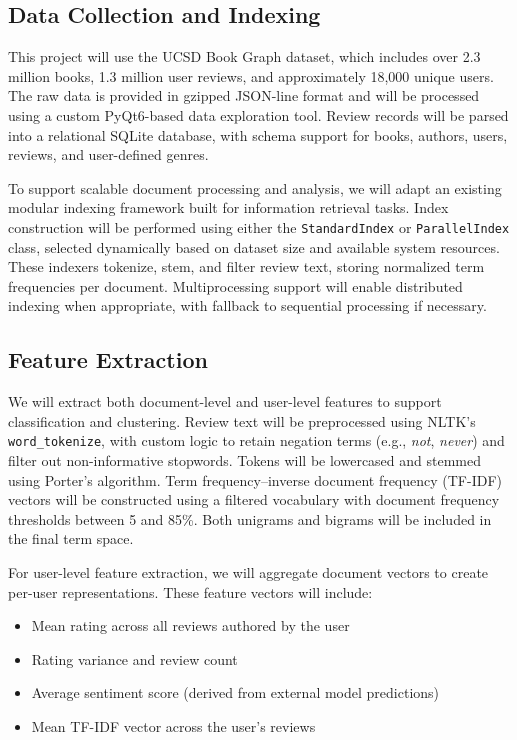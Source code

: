 \subsection{Data Collection and Indexing}
This project will use the UCSD Book Graph dataset, which includes over 2.3 million books, 1.3 million user reviews, and approximately 18,000 unique users. The raw data is provided in gzipped JSON-line format and will be processed using a custom PyQt6-based data exploration tool. Review records will be parsed into a relational SQLite database, with schema support for books, authors, users, reviews, and user-defined genres. 

To support scalable document processing and analysis, we will adapt an existing modular indexing framework built for information retrieval tasks. Index construction will be performed using either the \texttt{StandardIndex} or \texttt{ParallelIndex} class, selected dynamically based on dataset size and available system resources. These indexers tokenize, stem, and filter review text, storing normalized term frequencies per document. Multiprocessing support will enable distributed indexing when appropriate, with fallback to sequential processing if necessary.

\subsection{Feature Extraction}
We will extract both document-level and user-level features to support classification and clustering. Review text will be preprocessed using NLTK’s \texttt{word\_tokenize}, with custom logic to retain negation terms (e.g., \textit{not}, \textit{never}) and filter out non-informative stopwords. Tokens will be lowercased and stemmed using Porter’s algorithm. Term frequency–inverse document frequency (TF-IDF) vectors will be constructed using a filtered vocabulary with document frequency thresholds between 5 and 85\%. Both unigrams and bigrams will be included in the final term space.

For user-level feature extraction, we will aggregate document vectors to create per-user representations. These feature vectors will include:
\begin{itemize}
  \item Mean rating across all reviews authored by the user
  \item Rating variance and review count
  \item Average sentiment score (derived from external model predictions)
  \item Mean TF-IDF vector across the user’s reviews
\end{itemize}

